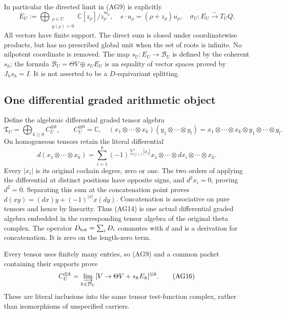 In particular the directed limit in (AG9) is explicitly
\[
 E_U:=\bigoplus_{\substack{\rho\in U\\g(\rho)=0}}
       \mathbb C[z_\rho]/z_\rho^{m_\rho},
 \quad s\cdot u_\rho=(\rho+z_\rho)u_\rho,
 \quad \sigma_U:E_U\xrightarrow{\sim}T_UQ.
 \tag{AG13}
\]
All vectors have finite support.  The direct sum is closed under
coordinatewise products, but has no prescribed global unit when
the set of roots is infinite.  No nilpotent coordinate is removed.
The map $s_U:E_U\to\mathscr B_U$ is defined by the coherent
$s_h$; the formula $\mathscr B_U=\Theta V\oplus s_UE_U$
is an equality of vector spaces proved by $J_hs_h=I$.
It is not asserted to be a $D$-equivariant splitting.

\subsection{One differential graded arithmetic object}

Define the algebraic differential graded tensor algebra
\[
 \mathfrak T_U=\bigoplus_{k\ge0}C_U^{\otimes k},\qquad
 C_U^{\otimes0}=\mathbb C,
 \quad(x_1\otimes\cdots\otimes x_k)
       (y_1\otimes\cdots\otimes y_l)
       =x_1\otimes\cdots\otimes x_k\otimes
        y_1\otimes\cdots\otimes y_l.
 \tag{AG14}
\]
On homogeneous tensors retain the literal differential
\[
 d(x_1\otimes\cdots\otimes x_k)
 =\sum_{i=1}^k(-1)^{\sum_{j<i}|x_j|}
 x_1\otimes\cdots\otimes dx_i\otimes\cdots\otimes x_k.
 \tag{AG15}
\]
Every $|x_i|$ is its original cochain degree, zero or one.
The two orders of applying the differential at distinct positions
have opposite signs, and $d^2x_i=0$, proving $d^2=0$.
Separating this sum at the concatenation point proves
$d(xy)=(dx)y+(-1)^{|x|}x(dy)$.  Concatenation is associative
on pure tensors and hence by linearity.  Thus (AG14) is one actual
differential graded algebra embedded in the corresponding tensor
algebra of the original theta complex.  The operator
$D_{\rm tot}=\sum_iD_i$ commutes with $d$ and is a derivation
for concatenation.  It is zero on the length-zero term.

Every tensor uses finitely many entries, so (AG9) and a common
packet containing their supports prove
\[
 C_U^{\otimes k}
 =\varinjlim_{h\in\mathcal D_U}
 [V\to\Theta V+s_hE_h]^{\otimes k}.
 \tag{AG16}
\]
These are literal inclusions into the same tensor test-function
complex, rather than isomorphisms of unspecified carriers.


